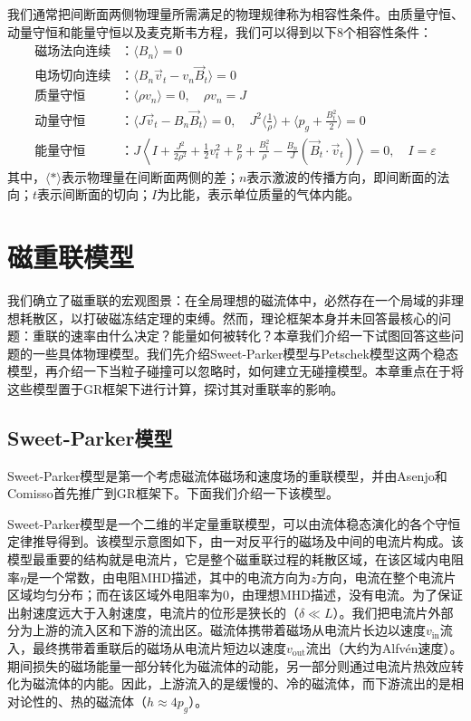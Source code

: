 \documentclass[lang=cn,color=blue,cm,11pt,scheme=chinese,bibend=bibtex,sorting=nty]{elegantbook}
\begin{document}
	我们通常把间断面两侧物理量所需满足的物理规律称为相容性条件。由质量守恒、动量守恒和能量守恒以及麦克斯韦方程，我们可以得到以下8个相容性条件：
	\begin{align*}
		\text{磁场法向连续} &： \langle B_n \rangle = 0\\
		\text{电场切向连续} &： \langle B_n \vec{v}_t - v_n \vec{B}_t \rangle = 0\\
		\text{质量守恒} &： \langle \rho v_n \rangle = 0, \quad \rho v_n = J\\
		\text{动量守恒} &： \langle J \vec{v}_t - B_n \vec{B}_t \rangle = 0, \quad J^2 \langle \frac{1}{\rho} \rangle + \langle p_g + \frac{B^2_t}{2} \rangle = 0\\
		\text{能量守恒} &： J \left\langle I + \frac{J^2}{2 \rho^2} + \frac{1}{2} v^2_t + \frac{p}{\rho} + \frac{B^2_t}{\rho} - \frac{B_n}{J} (\vec{B}_t \cdot \vec{v}_t) \right\rangle = 0, \quad I = \varepsilon
	\end{align*}
	其中，$\langle * \rangle$表示物理量在间断面两侧的差；$n$表示激波的传播方向，即间断面的法向；$t$表示间断面的切向；$I$为比能，表示单位质量的气体内能。
	
	\chapter{磁重联模型}
	
	我们确立了磁重联的宏观图景：在全局理想的磁流体中，必然存在一个局域的非理想耗散区，以打破磁冻结定理的束缚。然而，理论框架本身并未回答最核心的问题：重联的速率由什么决定？能量如何被转化？本章我们介绍一下试图回答这些问题的一些具体物理模型。我们先介绍Sweet-Parker模型与Petschek模型这两个稳态模型，再介绍一下当粒子碰撞可以忽略时，如何建立无碰撞模型。本章重点在于将这些模型置于GR框架下进行计算，探讨其对重联率的影响。
	
	\section{Sweet-Parker模型}
	
	Sweet-Parker模型是第一个考虑磁流体磁场和速度场的重联模型，并由Asenjo和Comisso首先推广到GR框架下。下面我们介绍一下该模型。
	
	Sweet-Parker模型是一个二维的半定量重联模型，可以由流体稳态演化的各个守恒定律推导得到。该模型示意图如下，由一对反平行的磁场及中间的电流片构成。该模型最重要的结构就是电流片，它是整个磁重联过程的耗散区域，在该区域内电阻率$\eta$是一个常数，由电阻MHD描述，其中的电流方向为$z$方向，电流在整个电流片区域均匀分布；而在该区域外电阻率为0，由理想MHD描述，没有电流。为了保证出射速度远大于入射速度，电流片的位形是狭长的（$\delta \ll L$）。我们把电流片外部分为上游的流入区和下游的流出区。磁流体携带着磁场从电流片长边以速度$v_{\text{in}}$流入，最终携带着重联后的磁场从电流片短边以速度$v_{\text{out}}$流出（大约为Alfvén速度）。期间损失的磁场能量一部分转化为磁流体的动能，另一部分则通过电流片热效应转化为磁流体的内能。因此，上游流入的是缓慢的、冷的磁流体，而下游流出的是相对论性的、热的磁流体（$h \approx 4 p_g$）。
	
\end{document}
